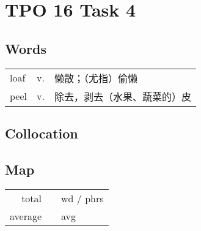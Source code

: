 \section{TPO 16 Task 4}

\subsection{Words}

\begin{tabular}{lll}
    loaf & v. & 懒散；（尤指）偷懒      \\
    peel & v. & 除去，剥去（水果、蔬菜的）皮 \\
\end{tabular}

\subsection{Collocation}

\subsection{Map}

\begin{tabular}{rc@{\quad$\to$\quad}l}
    total   &  & wd / phrs \\
    average &  & avg       \\
\end{tabular}
